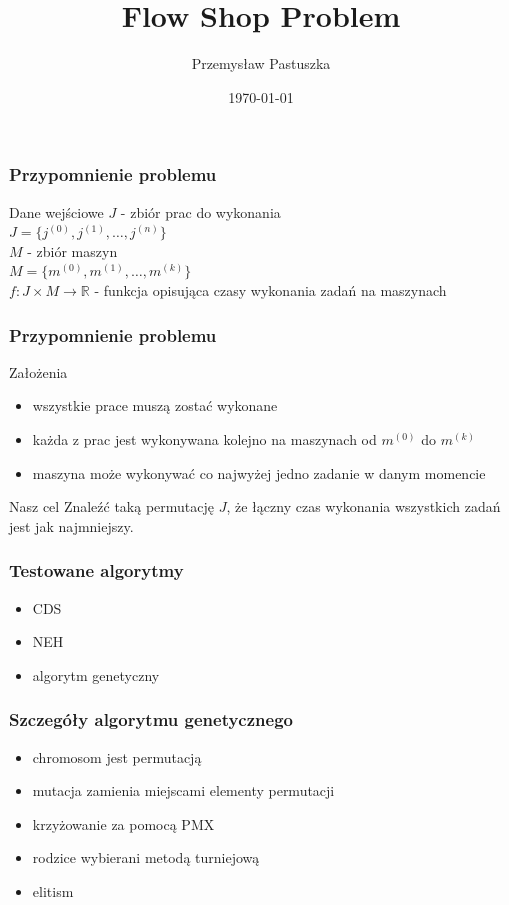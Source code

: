 \documentclass{beamer}
\author{Przemysław Pastuszka}
\institute{Instytut Informatyki UWr}
\date{\today}
\title{Flow Shop Problem}
\begin{document}
\frame{
    \titlepage
}


\begin{frame}
    \frametitle{Przypomnienie problemu}
    \begin{block}{Dane wejściowe}
        $J$ - zbiór prac do wykonania \\
        $J = \{j^{(0)}, j^{(1)}, \ldots, j^{(n)}\}$ \\
        $M$ - zbiór maszyn \\
        $M = \{m^{(0)}, m^{(1)}, \ldots, m^{(k)}\}$ \\
        $f: J \times M \rightarrow \mathbb{R}$ - funkcja opisująca czasy wykonania zadań na maszynach
    \end{block}
    \end{frame}

\begin{frame}
\frametitle{Przypomnienie problemu}
        \begin{block}{Założenia}
                \begin{itemize}
          \item wszystkie prace muszą zostać wykonane
          \item każda z prac jest wykonywana kolejno na maszynach od $m^{(0)}$ do $m^{(k)}$
          \item maszyna może wykonywać co najwyżej jedno zadanie w danym momencie
        \end{itemize}
    \end{block}
    \pause
    \begin{block}{Nasz cel}
        Znaleźć taką permutację $J$, że łączny czas wykonania wszystkich zadań jest jak najmniejszy.
    \end{block}
\end{frame}

\begin{frame}
    \frametitle{Testowane algorytmy}
        \begin{itemize}
          \item CDS
          \item NEH
          \item algorytm genetyczny
        \end{itemize}
\end{frame}

\begin{frame}
    \frametitle{Szczegóły algorytmu genetycznego}
        \begin{itemize}
          \item chromosom jest permutacją
          \item mutacja zamienia miejscami elementy permutacji
          \item krzyżowanie za pomocą PMX
          \item rodzice wybierani metodą turniejową
          \item elitism
        \end{itemize}
\end{frame}
\end{document}
